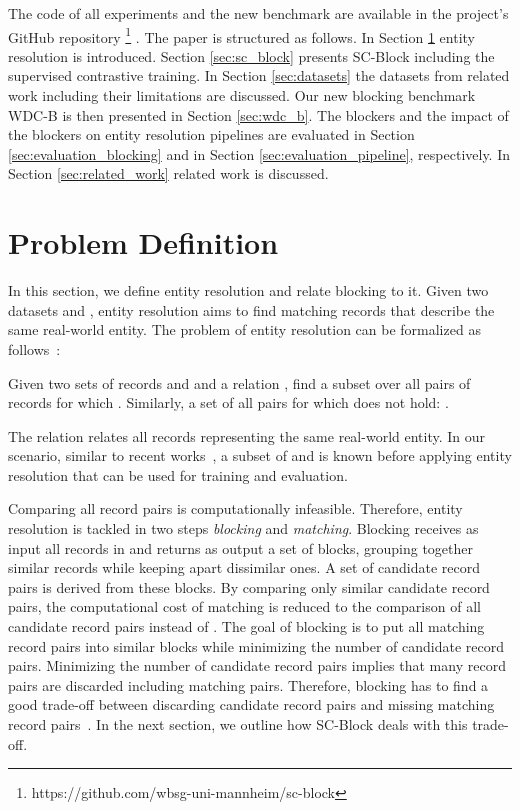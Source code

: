 \documentclass[sigconf,nonacm]{acmart}
\begin{document}
The code of all experiments and the new benchmark are available in the project's GitHub repository
\footnote{https://github.com/wbsg-uni-mannheim/sc-block}
.
The paper is structured as follows. In Section \ref{sec:problem_definition} entity resolution is introduced. Section \ref{sec:sc_block} presents SC-Block including the supervised contrastive training. In Section \ref{sec:datasets} the datasets from related work including their limitations are discussed. Our new blocking benchmark WDC-B is then presented in Section \ref{sec:wdc_b}. The blockers and the impact of the blockers on entity resolution pipelines are evaluated in Section \ref{sec:evaluation_blocking} and in Section \ref{sec:evaluation_pipeline}, respectively. In Section \ref{sec:related_work} related work is discussed.
 

\section{Problem Definition}
\label{sec:problem_definition}




In this section, we define entity resolution and relate blocking to it. Given two datasets  and , entity resolution aims to find matching records 
that describe the same real-world entity.
The problem of entity resolution can be formalized as follows~\cite{fellegi_theory_1969}:
\begin{definition}
  Given two sets of records  and  and a relation , find a subset over all pairs of records  for which . Similarly, a set of all pairs for which  does not hold:
  .
\end{definition}

The relation  relates all records representing the same real-world entity. In our scenario, similar to recent works~\cite{zhang_autoblock_2020,papadakis_supervised_2014,thirumuruganathan_deep_2021}, a subset of  and  is known before applying entity resolution that can be used for training and evaluation.

Comparing all record pairs  is computationally infeasible. Therefore, entity resolution is tackled in two steps \emph{blocking} and \emph{matching}. Blocking receives as input all records in  and returns as output a set of blocks, grouping together similar records while keeping apart dissimilar ones. A set of candidate record pairs  is derived from these blocks. By comparing only similar candidate record pairs, the computational cost of matching is reduced to the comparison of all candidate record pairs instead of . The goal of blocking is to put all matching record pairs into similar blocks while minimizing the number of candidate record pairs. Minimizing the number of candidate record pairs implies that many record pairs are discarded including matching pairs. Therefore, blocking has to find a good trade-off between discarding candidate record pairs and missing matching record pairs~\cite{christophides_overview_2021, christen_data_2012}. In the next section, we outline how SC-Block deals with this trade-off.
\end{document}
